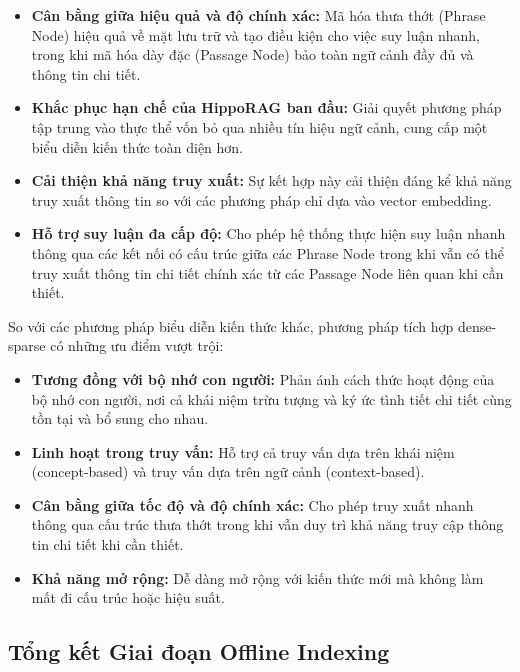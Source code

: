 \begin{itemize}
    \item \textbf{Cân bằng giữa hiệu quả và độ chính xác:} Mã hóa thưa thớt (Phrase Node) hiệu quả về mặt lưu trữ và tạo điều kiện cho việc suy luận nhanh, trong khi mã hóa dày đặc (Passage Node) bảo toàn ngữ cảnh đầy đủ và thông tin chi tiết.
    
    \item \textbf{Khắc phục hạn chế của HippoRAG ban đầu:} Giải quyết phương pháp tập trung vào thực thể vốn bỏ qua nhiều tín hiệu ngữ cảnh, cung cấp một biểu diễn kiến thức toàn diện hơn.
    
    \item \textbf{Cải thiện khả năng truy xuất:} Sự kết hợp này cải thiện đáng kể khả năng truy xuất thông tin so với các phương pháp chỉ dựa vào vector embedding.
    
    \item \textbf{Hỗ trợ suy luận đa cấp độ:} Cho phép hệ thống thực hiện suy luận nhanh thông qua các kết nối có cấu trúc giữa các Phrase Node trong khi vẫn có thể truy xuất thông tin chi tiết chính xác từ các Passage Node liên quan khi cần thiết.
\end{itemize}

So với các phương pháp biểu diễn kiến thức khác, phương pháp tích hợp dense-sparse có những ưu điểm vượt trội:

\begin{itemize}
    \item \textbf{Tương đồng với bộ nhớ con người:} Phản ánh cách thức hoạt động của bộ nhớ con người, nơi cả khái niệm trừu tượng và ký ức tình tiết chi tiết cùng tồn tại và bổ sung cho nhau.
    
    \item \textbf{Linh hoạt trong truy vấn:} Hỗ trợ cả truy vấn dựa trên khái niệm (concept-based) và truy vấn dựa trên ngữ cảnh (context-based).
    
    \item \textbf{Cân bằng giữa tốc độ và độ chính xác:} Cho phép truy xuất nhanh thông qua cấu trúc thưa thớt trong khi vẫn duy trì khả năng truy cập thông tin chi tiết khi cần thiết.
    
    \item \textbf{Khả năng mở rộng:} Dễ dàng mở rộng với kiến thức mới mà không làm mất đi cấu trúc hoặc hiệu suất.
\end{itemize}

\subsection{Tổng kết Giai đoạn Offline Indexing}

